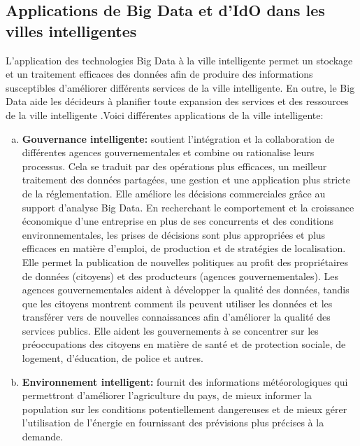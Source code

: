 \documentclass[french, a4paper, 12pt]{report}
\begin{document}
\subsection{Applications de Big Data et d'IdO dans les villes intelligentes}
L'application des technologies Big Data à la ville intelligente permet un stockage et un traitement efficaces des données afin de produire des informations susceptibles d'améliorer différents services de la ville intelligente. En outre, le Big Data aide les décideurs à planifier toute expansion des services et des ressources de la ville intelligente \cite{9}.Voici différentes applications de la ville intelligente:

\begin{enumerate}[a.] 
\item \textbf{Gouvernance intelligente:} soutient l'intégration et la collaboration de différentes agences gouvernementales et combine ou rationalise leurs processus. Cela se traduit par des opérations plus efficaces, un meilleur traitement des données partagées, une gestion et une application plus stricte de la réglementation.
Elle améliore les décisions commerciales grâce au support d'analyse Big Data. En recherchant le comportement et la croissance économique d’une entreprise en plus de ses concurrents et des conditions environnementales, les prises de décisions sont plus appropriées et plus efficaces en matière d’emploi, de production et de stratégies de localisation.
Elle permet la publication de nouvelles politiques au profit des propriétaires de données (citoyens) et des producteurs (agences gouvernementales). Les agences gouvernementales aident à développer la qualité des données, tandis que les citoyens montrent comment ils peuvent utiliser les données et les transférer vers de nouvelles connaissances afin d'améliorer la qualité des services publics.
Elle aident les gouvernements à se concentrer sur les préoccupations des citoyens en matière de santé et de protection sociale, de logement, d’éducation, de police et autres.\\

\item \textbf{Environnement intelligent:} fournit des informations météorologiques qui permettront d’améliorer l’agriculture du pays, de mieux informer la population sur les conditions potentiellement dangereuses et de mieux gérer l’utilisation de l’énergie en fournissant des prévisions plus précises à la demande.\\


\end{enumerate}
\end{document}
